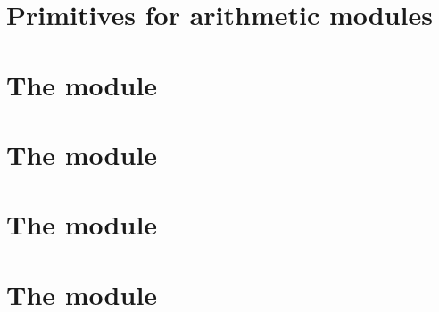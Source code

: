 \chapter{Primitives for arithmetic modules}       \label{alu: primitives}    \minitoc    
\chapter{The \addMod{} module \specDeprecated{}}  \label{alu: add}           \minitoc    
\chapter{The \mulMod{} module}                    \label{alu: mul}           \minitoc    
\chapter{The \modMod{} module}                    \label{alu: mod}           \minitoc    
\chapter{The \extMod{} module}                    \label{alu: ext}           \minitoc    

